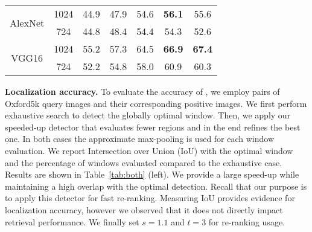 \begin{table}
\begin{minipage}{0.49\textwidth}
\begin{tabular}{|@{\ssp}c@{\ssp}|@{\ssp}c@{\ssp}|@{\ssp}c@{\ssp}|c@{\bsp}c@{\bsp}c@{\bsp}c|}
\multirow{2}{*}{AlexNet} &					 1024					 & 		 								 			44.9 						&       47.9    &     54.6   &     \textbf{56.1}  &       55.6   \\
												 &            724 			   & 										       44.8            &       48.4    &     54.4   &     54.3  &       52.6   \\
\hline
\multirow{2}{*}{VGG16}   & 					 1024          &                           55.2            &       57.3    &     64.5   &     \textbf{66.9}  &       \textbf{67.4}   \\
		                     &            724          &                        52.2            &       54.8    &     58.0   &     60.9  &       60.3   \\
\hline
\end{tabular}
\end{minipage}
\vspace{2ex}
\end{table}

\textbf{Localization accuracy.}
To evaluate the accuracy of \deeploc, we employ pairs of Oxford5k query images and their corresponding positive images.
We first perform exhaustive search to detect the globally optimal window.
Then, we apply our speeded-up detector that evaluates fewer regions and in the end refines the best one.
In both cases the approximate max-pooling is used for each window evaluation.
We report Intersection over Union (IoU) with the optimal window and the percentage of windows evaluated compared to the exhaustive case.
Results are shown in Table~\ref{tab:both} (left).
We provide a large speed-up while maintaining a high overlap with the optimal detection.
Recall that our purpose is to apply this detector for fast re-ranking.
Measuring IoU provides evidence for localization accuracy, however we observed that it does not directly impact retrieval performance.
We finally set $s=1.1$ and $t=3$ for re-ranking usage.

